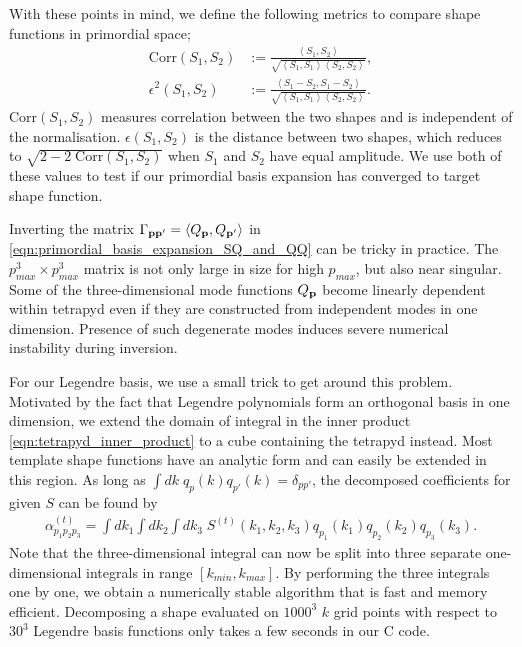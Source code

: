 With these points in mind, we define the following metrics to compare shape functions in primordial space;
\begin{align}
	\text{Corr}(S_1, S_2) &:= \frac{\left< S_1, S_2 \right>}{ \sqrt{ \left< S_1, S_1 \right> \left< S_2, S_2 \right> } }, \\
	\epsilon^2(S_1, S_2) &:= \frac{\left< S_1 - S_2, S_1 - S_2 \right> }{\sqrt{\left< S_1, S_1 \right> \left< S_2, S_2 \right>}}. \label{def:primordial_shape_epsilon}
\end{align}
Corr$(S_1,S_2)$ measures correlation between the two shapes and is independent of the normalisation. $\epsilon(S_1,S_2)$ is the distance between two shapes, which reduces to $\sqrt{2 - 2\;\text{Corr}(S_1,S_2)}$ when $S_1$ and $S_2$ have equal amplitude. We use both of these values to test if our primordial basis expansion has converged to target shape function. 

Inverting the matrix $\Gamma_{\mathbf{p} \mathbf{p}'} = \left< Q_\mathbf{p}, Q_{\mathbf{p}'} \right>$ in \eqref{eqn:primordial_basis_expansion_SQ_and_QQ} can be tricky in practice. The $p_{max}^3 \times p_{max}^3$ matrix is not only large in size for high $p_{max}$, but also near singular. Some of the three-dimensional mode functions $Q_\mathbf{p}$ become linearly dependent within tetrapyd even if they are constructed from independent modes in one dimension. Presence of such degenerate modes induces severe numerical instability during inversion.

For our Legendre basis, we use a small trick to get around this problem. Motivated by the fact that Legendre polynomials form an orthogonal basis in one dimension, we extend the domain of integral in the inner product \eqref{eqn:tetrapyd_inner_product} to a cube containing the tetrapyd instead. Most template shape functions have an analytic form and can easily be extended in this region. As long as $\int dk \; q_p(k) q_{p'}(k) = \delta_{pp'}$, the decomposed coefficients for given $S$ can be found by
\begin{align}
	\alpha^{(t)}_{p_1 p_2 p_3} = \int dk_1 \int dk_2 \int dk_3 \; S^{(t)}(k_1, k_2, k_3) q_{p_1}(k_1) q_{p_2}(k_2) q_{p_3}(k_3). \label{eqn:basis_expansion}
\end{align}
Note that the three-dimensional integral can now be split into three separate one-dimensional integrals in range $[k_{min}, k_{max}]$. By performing the three integrals one by one, we obtain a numerically stable algorithm that is fast and memory efficient. Decomposing a shape evaluated on $1000^3$ $k$ grid points with respect to $30^3$ Legendre basis functions only takes a few seconds in our \textsc{C} code.

